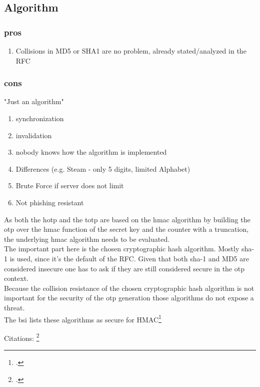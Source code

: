 \subsection{Algorithm}

\subsubsection{pros}

\begin{enumerate}
	\item Collisions in MD5 or SHA1 are no problem, already stated/analyzed in the RFC
\end{enumerate}

\subsubsection{cons}

"Just an algorithm"

\begin{enumerate}
	\item synchronization
	\item invalidation
	\item nobody knows how the algorithm is implemented
	\item Differences (e.g. Steam - only 5 digits, limited Alphabet)
	\item Brute Force if server does not limit
	\item Not phishing resistant
\end{enumerate}

As both the \gls{hotp} and the \gls{totp} are based on the \gls{hmac} algorithm by building the \gls{otp} over the \gls{hmac} function of the secret key and the counter with a truncation, the underlying \gls{hmac} algorithm needs to be evaluated.\\
The important part here is the chosen cryptographic hash algorithm. Mostly \gls{sha}-1 is used, since it's the default of the RFC. Given that both \gls{sha}-1 and MD5 are considered insecure one has to ask if they are still considered secure in the \gls{otp} context.\\
Because the collision resistance of the chosen cryptographic hash algorithm is not important for the security of the \gls{otp} generation those algorithms do not expose a threat.\\
The \gls{bsi} lists these algorithms as secure for HMAC\footcite{bsi2019recommendations}

Citations: \footcite{10.1007/978-3-319-63688-7_19}

